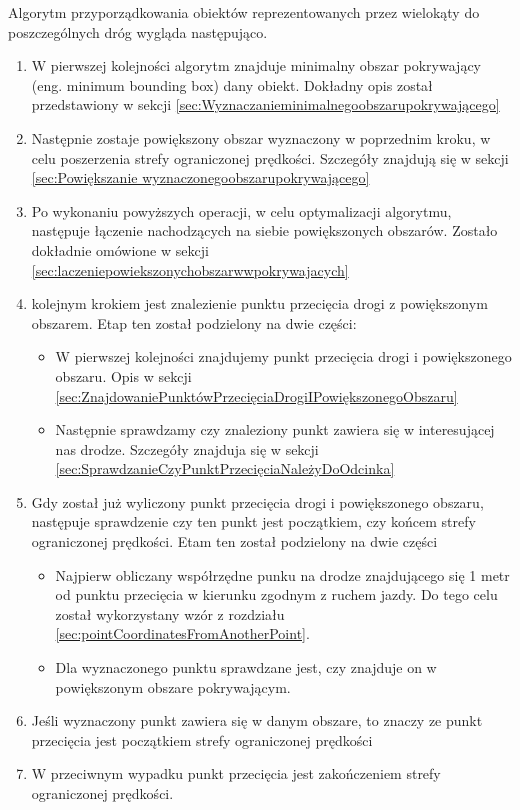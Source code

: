 Algorytm przyporządkowania obiektów reprezentowanych przez wielokąty do poszczególnych dróg wygląda następująco.
\begin{enumerate}
\item W pierwszej kolejności algorytm znajduje minimalny obszar pokrywający (eng. minimum bounding box) dany obiekt. Dokładny opis został przedstawiony w sekcji \ref{sec:Wyznaczanieminimalnegoobszarupokrywającego}
\item Następnie zostaje powiększony obszar wyznaczony w poprzednim kroku, w celu poszerzenia strefy ograniczonej prędkości. Szczegóły znajdują się w sekcji \ref{sec:Powiększanie wyznaczonegoobszarupokrywającego}
\item Po wykonaniu powyższych operacji, w celu optymalizacji algorytmu, następuje łączenie nachodzących na siebie powiększonych obszarów.  Zostało dokładnie omówione w sekcji \ref{sec:laczeniepowiekszonychobszarwwpokrywajacych}
\item kolejnym krokiem jest znalezienie punktu przecięcia drogi z powiększonym obszarem. Etap ten został podzielony na dwie części:
\begin{itemize}
\item W pierwszej kolejności znajdujemy punkt przecięcia drogi i powiększonego obszaru. Opis w sekcji \ref{sec:ZnajdowaniePunktówPrzecięciaDrogiIPowiększonegoObszaru}
\item Następnie sprawdzamy czy znaleziony punkt zawiera się w interesującej nas drodze. Szczegóły znajduja się w sekcji \ref{sec:SprawdzanieCzyPunktPrzecięciaNależyDoOdcinka}
\end{itemize}
\item Gdy został już wyliczony punkt przecięcia drogi i powiększonego obszaru, następuje sprawdzenie czy ten punkt jest początkiem, czy końcem strefy ograniczonej prędkości. Etam ten został podzielony na dwie części
\begin{itemize}
\item Najpierw obliczany współrzędne punku na drodze znajdującego się 1 metr od punktu przecięcia w kierunku zgodnym z ruchem jazdy. Do tego celu został wykorzystany wzór z rozdziału \ref{sec:pointCoordinatesFromAnotherPoint}.
\item Dla wyznaczonego punktu sprawdzane jest, czy znajduje on w powiększonym obszare pokrywającym.
\end{itemize}
\item Jeśli wyznaczony punkt zawiera się w danym obszare, to znaczy ze punkt przecięcia jest początkiem strefy ograniczonej prędkości
\item W przeciwnym wypadku punkt przecięcia jest zakończeniem strefy ograniczonej prędkości.
\end{enumerate}

